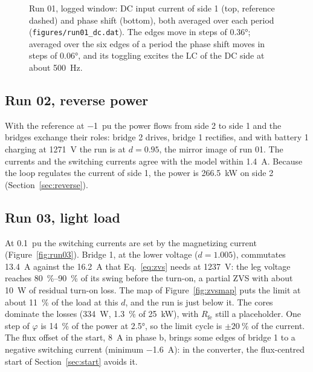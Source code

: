 \documentclass[12pt,a4paper]{scrartcl}
\newcommand{\ped}[1]{_{\mathrm{#1}}}
\newcommand{\code}[1]{\texttt{#1}}
\begin{document}
\begin{onehalfspace}
\begin{figure}[H]
	\captionsetup{width=0.85\textwidth, font=small}
	\caption[Run 01: limit cycle of the phase quantization.]{Run 01, logged window: DC input current of side 1 (top, reference dashed) and phase shift (bottom), both averaged over each period (\code{figures/run01\_dc.dat}). The edges move in steps of \ang{0.36}; averaged over the six edges of a period the phase shift moves in steps of \ang{0.06}, and its toggling excites the LC of the DC side at about \SI{500}{\hertz}.}
	\label{fig:limitcycle}
\end{figure}

\subsection{Run 02, reverse power}
\label{sec:run02}

With the reference at \SI{-1}{pu} the power flows from side 2 to side 1 and the bridges exchange their roles: bridge 2 drives, bridge 1 rectifies, and with battery 1 charging at \SI{1271}{\volt} the run is at $d = 0.95$, the mirror image of run 01. The currents and the switching currents agree with the model within \SI{1.4}{\ampere}. Because the loop regulates the current of side 1, the power is \SI{266.5}{\kilo\watt} on side 2 (Section~\ref{sec:reverse}).

\subsection{Run 03, light load}
\label{sec:run03}

At \SI{0.1}{pu} the switching currents are set by the magnetizing current (Figure~\ref{fig:run03}). Bridge 1, at the lower voltage ($d = 1.005$), commutates \SI{13.4}{\ampere} against the \SI{16.2}{\ampere} that Eq.~\eqref{eq:zvs} needs at \SI{1237}{\volt}: the leg voltage reaches \SIrange{80}{90}{\percent} of its swing before the turn-on, a partial ZVS with about \SI{10}{\watt} of residual turn-on loss. The map of Figure~\ref{fig:zvsmap} puts the limit at about \SI{11}{\percent} of the load at this $d$, and the run is just below it. The cores dominate the losses (\SI{334}{\watt}, \SI{1.3}{\percent} of \SI{25}{\kilo\watt}), with $R\ped{fe}$ still a placeholder. One step of $\varphi$ is \SI{14}{\percent} of the power at \ang{2.5}, so the limit cycle is $\pm\SI{20}{\percent}$ of the current. The flux offset of the start, \SI{8}{\ampere} in phase b, brings some edges of bridge 1 to a negative switching current (minimum \SI{-1.6}{\ampere}): in the converter, the flux-centred start of Section~\ref{sec:start} avoids it.


\end{onehalfspace}
\end{document}
